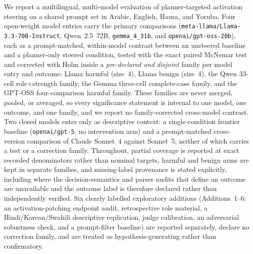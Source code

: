 We report a multilingual, multi-model evaluation of planner-targeted activation
steering on a shared prompt set in Arabic, English, Hausa, and Yoruba. Four
open-weight model entries carry the primary comparisons
(\texttt{meta-llama/Llama-3.3-70B-Instruct}, Qwen~2.5~72B, \texttt{gemma\_4\_31b},
and \texttt{openai/gpt-oss-20b}), each as a prompt-matched, within-model contrast
between an unsteered baseline and a planner-only steered condition, tested with
the exact paired McNemar test and corrected with Holm inside a \emph{pre-declared
and disjoint} family per model entry and outcome: Llama harmful (size~4), Llama
benign (size~4), the Qwen 33-cell role$\times$strength family, the Gemma
three-cell complete-case family, and the GPT-OSS four-comparison harmful family.
These families are never merged, pooled, or averaged, so every significance
statement is internal to one model, one outcome, and one family, and we report no
family-corrected cross-model contrast. Two closed models enter only as
descriptive context: a single-condition frontier baseline
(\texttt{openai/gpt-5}, no intervention arm) and a prompt-matched cross-version
comparison of Claude Sonnet~4 against Sonnet~5, neither of which carries a test
or a correction family. Throughout, partial coverage is reported at exact
recorded denominators rather than nominal targets, harmful and benign arms are
kept in separate families, and missing-label provenance is stated explicitly,
including where the decision-semantics and parser audits that define an outcome
are unavailable and the outcome label is therefore declared rather than
independently verified. Six clearly labelled exploratory additions
(Additions~1--6: an activation-patching endpoint audit, retrospective role
material, a Hindi/Korean/Swahili descriptive replication, judge calibration, an
adversarial robustness check, and a prompt-filter baseline) are reported
separately, declare no correction family, and are treated as
hypothesis-generating rather than confirmatory.

